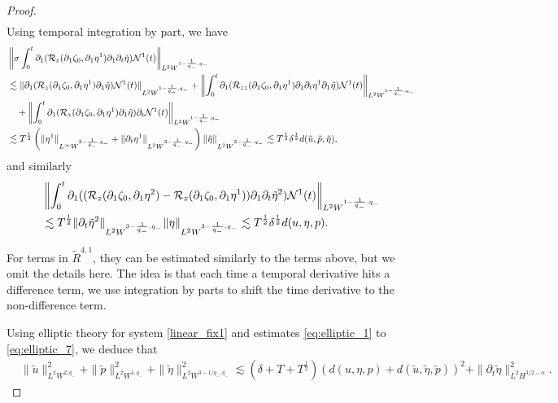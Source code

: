 \documentclass[letterpaper,reqno,10pt,twoside]{amsart}
\theoremstyle{definition}
\theoremstyle{remark}
\def\p{\partial}
\def\no{\nonumber}
\begin{document}
\begin{proof}
\begin{align}
			\end{align}
			\noindent  Using temporal integration by part, we have
			\begin{align}
				&\left \|\sigma\int_{0}^{t}\p_{1}(\mathcal{R}_{z}(\p_{1}\zeta_{0},\p_{1}\eta^{1})\p_{1}\p_{t}\tilde{\eta})\mathcal{N}^{1}(t) \right\|_{L^{2}W^{1-\frac{1}{q_{-}},q_{-}}}\\
				&\lesssim \|\p_{1}(\mathcal{R}_{z}(\p_{1}\zeta_{0},\p_{1}\eta^{1})\p_{1}\tilde{\eta})\mathcal{N}^{1}(t)\|_{L^{2}W^{1-\frac{1}{q_{-}},q_{-}}}+ \left\|\int_{0}^{t}\p_{1}(\mathcal{R}_{zz}(\p_{1}\zeta_{0},\p_{1}\eta^{1})\p_{1}\p_{t}\eta^{1}\p_{1}\tilde{\eta})\mathcal{N}^{1}(t) \right\|_{L^{2}W^{1-\frac{1}{q_{-}},q_{-}}}\notag\\
				&\quad+ \left\|\int_{0}^{t}\p_{1}(\mathcal{R}_{z}(\p_{1}\zeta_{0},\p_{1}\eta^{1})\p_{1}\tilde{\eta})\p_{t}\mathcal{N}^{1}(t) \right\|_{L^{2}W^{1-\frac{1}{q_{-}},q_{-}}}\notag\\
				&\lesssim T^{\frac{1}{2}}\left(\|\eta^{1}\|_{L^{\infty}W^{3-\frac{1}{q_{-}},q_{-}}}+\|\p_{t}\eta^{1}\|_{L^{2}W^{3-\frac{1}{q_{-}},q_{-}}} \right)\|\tilde{\eta}\|_{L^{2}W^{3-\frac{1}{q_{-}},q_{-}}}\notag\lesssim T^{\frac{1}{2}}\delta^{\frac{1}{2}}d(\tilde{u},\tilde{p},\tilde{\eta}),\no
			\end{align}
			\noindent and similarly
			\begin{align}\label{eq:elliptic_7}
				&\left \|\int_{0}^{t}\p_{1}((\mathcal{R}_{z}(\p_{1}\zeta_{0},\p_{1}\eta^{2})-\mathcal{R}_{z}(\p_{1}\zeta_{0},\p_{1}\eta^{1}))\p_{1}\p_{t}\tilde{\eta}^{2})\mathcal{N}^{1}(t) \right\|_{L^{2}W^{1-\frac{1}{q_{-}},q_{-}}}\notag\\
				&\lesssim T^{\frac{1}{2}}\|\p_{t}\tilde{\eta}^{2}\|_{L^{2}W^{3-\frac{1}{q_{-}},q_{-}}} \|\eta\|_{L^{2}W^{3-\frac{1}{q_{-}},q_{-}}} \lesssim T^{\frac{1}{2}}\delta^{\frac{1}{2}}d(u,\eta,p).
			\end{align}
			
			For terms in $\tilde{R}^{4,1}$, they can be estimated similarly to the terms above, but we omit the details here. The idea is that each time a temporal derivative hits a difference term, we use integration by parts to shift the time derivative to the non-difference term.
			
			Using elliptic theory for system \eqref{linear_fix1} and estimates \eqref{eq:elliptic_1} to \eqref{eq:elliptic_7}, we deduce that
			\begin{equation}\label{est:elliptic_8}
				\begin{aligned}
					&\|\tilde{u}\|_{L^2W^{2,q_-}}^2+\|\tilde{p}\|_{L^2W^{1,q_-}}^2+\|\tilde{\eta}\|_{L^2W^{3-1/q_-,q_-}}^2\lesssim (\delta+T+T^{\frac{1}{2}})(d(u,\eta,p)+d(\tilde{u},\tilde{\eta},\tilde{p}))^2
					+\|\p_t\tilde{\eta}\|_{L^2H^{3/2-\alpha}}^2.
				\end{aligned}
			\end{equation}
			

\end{proof}
\end{document}
